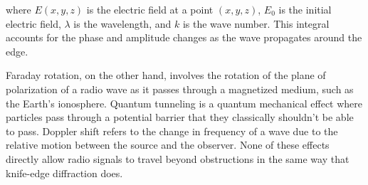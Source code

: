 where \( E(x, y, z) \) is the electric field at a point \((x, y, z)\), \( E_0 \) is the initial electric field, \( \lambda \) is the wavelength, and \( k \) is the wave number. This integral accounts for the phase and amplitude changes as the wave propagates around the edge.

Faraday rotation, on the other hand, involves the rotation of the plane of polarization of a radio wave as it passes through a magnetized medium, such as the Earth's ionosphere. Quantum tunneling is a quantum mechanical effect where particles pass through a potential barrier that they classically shouldn't be able to pass. Doppler shift refers to the change in frequency of a wave due to the relative motion between the source and the observer. None of these effects directly allow radio signals to travel beyond obstructions in the same way that knife-edge diffraction does.

